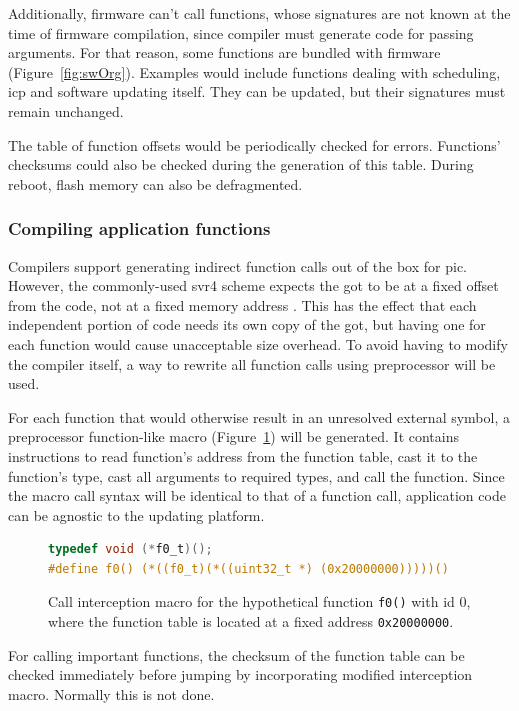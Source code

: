 Additionally, firmware can't call functions, whose signatures are not known at the time of firmware compilation, since compiler must generate code for passing arguments. For that reason, some functions are bundled with firmware (Figure~\ref{fig:swOrg}). Examples would include functions dealing with scheduling, \gls{icp} and software updating itself. They can be updated, but their signatures must remain unchanged.

The table of function offsets would be periodically checked for errors. Functions' checksums could also be checked during the generation of this table. During reboot, flash memory can also be defragmented.

\subsubsection{Compiling application functions}

Compilers support generating indirect function calls out of the box for \gls{pic}. However, the commonly-used \gls{svr4} scheme expects the \gls{got} to be at a fixed offset from the code, not at a fixed memory address \cite[Chapter~8]{Levine1999}. This has the effect that each independent portion of code needs its own copy of the \gls{got}, but having one for each function would cause unacceptable size overhead. To avoid having to modify the compiler itself, a way to rewrite all function calls using preprocessor will be used.

For each function that would otherwise result in an unresolved external symbol, a preprocessor function-like macro (Figure~\ref{fig:macro}) will be generated. It contains instructions to read function's address from the function table, cast it to the function's type, cast all arguments to required types, and call the function. Since the macro call syntax will be identical to that of a function call, application code can be agnostic to the updating platform.

\begin{figure} [htb]
\begin{lstlisting}[language=C]
typedef void (*f0_t)();
#define f0() (*((f0_t)(*((uint32_t *) (0x20000000)))))()
\end{lstlisting}
\caption{Call interception macro for the hypothetical function \texttt{f0()} with id 0, where the function table is located at a fixed address \texttt{0x20000000}.}
\label{fig:macro}
\end{figure}

For calling important functions, the checksum of the function table can be checked immediately before jumping by incorporating modified interception macro. Normally this is not done.

